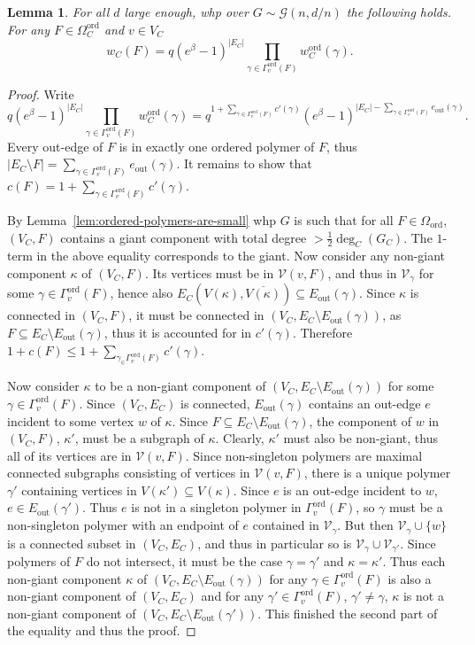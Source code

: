 \documentclass[11pt]{article}
\theoremstyle{plain}
\newtheorem{lemma}[theorem]{Lemma}
\newcommand{\G}{\mathcal{G}}
\newcommand{\V}{\mathcal{V}}
\newcommand{\Vin}{\V_\gamma}
\newcommand{\out}{\mathrm{out}}
\newcommand{\1}{\mathbb{1}}
\newcommand{\ord}{\mathrm{ord}}
\begin{document}
\begin{lemma}\label{lem:relate}
    For all \(d\) large enough, whp over \(G\sim\G(n,d/n)\) the following holds. For any \(F\in\Omega^\ord_C\) and \(v\in V_C\)
    \[
    w_C(F)=q(e^\beta-1)^{|E_C|}\prod_{\gamma\in\Gamma^\ord_v(F)} w_C^\ord(\gamma).
    \]
\end{lemma}
\begin{proof}
    Write
    \[
    q(e^\beta-1)^{|E_C|}\prod_{\gamma\in\Gamma^\ord_v(F)} w_C^\ord(\gamma) = q^{1 + \sum_{\gamma\in\Gamma^\ord_v(F)} c'(\gamma)} (e^\beta-1)^{|E_C| - \sum_{\gamma\in\Gamma^\ord_v(F)}  e_\out(\gamma)}.
    \]
    Every out-edge of \(F\) is in exactly one ordered polymer of \(F\), thus \( |E_C\setminus F| = \sum_{\gamma\in\Gamma^\ord_v(F)} e_\out(\gamma)\). It remains to show that  \(c(F) = 1 + \sum_{\gamma\in\Gamma^\ord_v(F)} c'(\gamma)\).
    
    By Lemma~\ref{lem:ordered-polymers-are-small} whp \(G\) is such that for all \(F\in\Omega_\ord\), \((V_C,F)\) contains a giant component with total degree \(>\frac{1}{2}\deg_C(G_C)\). The \(1\)-term in the above equality corresponds to the giant. Now consider any non-giant component \(\kappa\) of \((V_C,F)\). Its vertices must be in \(\V(v,F)\), and thus in \(\Vin\) for some \(\gamma\in\Gamma^\ord_v(F)\), hence also \(E_C(V(\kappa), \overline{V(\kappa)})\subseteq E_\out(\gamma)\). Since \(\kappa\) is connected in \((V_C,F)\), it must be connected in \((V_C,E_C\setminus E_\out(\gamma))\), as \(F\subseteq E_C\setminus E_\out(\gamma)\), thus it is accounted for in \(c'(\gamma)\). Therefore \(1 + c(F) \leq 1 + \sum_{\gamma_\in\Gamma_v^\ord(F)} c'(\gamma)\).

    Now consider \(\kappa\) to be a non-giant component of \((V_C,E_C\setminus E_\out(\gamma))\) for some \(\gamma\in\Gamma_v^\ord(F)\). Since \((V_C,E_C)\) is connected, \(E_\out(\gamma)\) contains an out-edge \(e\) incident to some vertex \(w\) of \(\kappa\). Since \(F\subseteq E_C\setminus E_\out(\gamma)\), the component of \(w\) in \((V_C,F)\), \(\kappa'\), must be a subgraph of \(\kappa\). Clearly, \(\kappa'\) must also be non-giant, thus all of its vertices are in \(\V(v,F)\). Since non-singleton polymers are maximal connected subgraphs consisting of vertices in \(\V(v, F)\), there is a unique polymer \(\gamma'\) containing vertices 
in $V(\kappa')\subseteq V(\kappa)$.
Since \(e\) is an out-edge incident to \(w\), \(e\in E_\out(\gamma')\). Thus \(e\) is not in a singleton polymer in \(\Gamma_{v}^\ord(F)\), so \(\gamma\) must be a non-singleton polymer with an endpoint of \(e\) contained in \(\Vin\). But then \(\Vin\cup\{w\}\) is a connected subset in \((V_C,E_C)\), and thus in particular so 
is
\(\Vin\cup \V_{\gamma'}\). Since polymers of \(F\) do not intersect, it must be the case \(\gamma = \gamma'\) and \(\kappa = \kappa'\). Thus  each non-giant component \(\kappa\) of \((V_C,E_C\setminus E_\out(\gamma))\) for any \(\gamma\in\Gamma_v^\ord(F)\) is also a non-giant component of \((V_C,E_C)\) and for any \(\gamma'\in\Gamma_v^\ord(F)\), \(\gamma'\neq \gamma\), \(\kappa\) is not a non-giant component of \((V_C,E_C\setminus E_\out(\gamma'))\). This finished the second part of the equality and thus the proof.
\end{proof}
\end{document}

